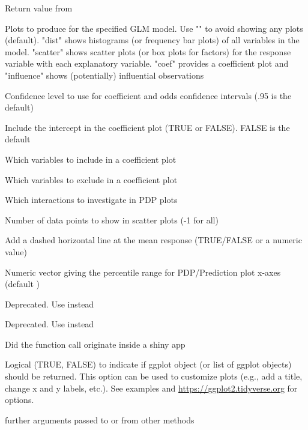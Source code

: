 \documentclass[a4paper]{book}
\begin{document}
\begin{Arguments}
\begin{ldescription}
\item[\code{x}] Return value from 

\item[\code{plots}] Plots to produce for the specified GLM model. Use "" to avoid showing any plots (default). "dist" shows histograms (or frequency bar plots) of all variables in the model. "scatter" shows scatter plots (or box plots for factors) for the response variable with each explanatory variable. "coef" provides a coefficient plot and "influence" shows (potentially) influential observations

\item[\code{conf\_lev}] Confidence level to use for coefficient and odds confidence intervals (.95 is the default)

\item[\code{intercept}] Include the intercept in the coefficient plot (TRUE or FALSE). FALSE is the default

\item[\code{incl}] Which variables to include in a coefficient plot

\item[\code{excl}] Which variables to exclude in a coefficient plot

\item[\code{incl\_int}] Which interactions to investigate in PDP plots

\item[\code{nrobs}] Number of data points to show in scatter plots (-1 for all)

\item[\code{hline}] Add a dashed horizontal line at the mean response (TRUE/FALSE or a numeric value)

\item[\code{pdp\_range}] Numeric vector  giving the percentile range for PDP/Prediction plot x-axes (default )

\item[\code{minq}] Deprecated. Use  instead

\item[\code{maxq}] Deprecated. Use  instead

\item[\code{shiny}] Did the function call originate inside a shiny app

\item[\code{custom}] Logical (TRUE, FALSE) to indicate if ggplot object (or list of ggplot objects) should be returned. This option can be used to customize plots (e.g., add a title, change x and y labels, etc.). See examples and \url{https://ggplot2.tidyverse.org} for options.

\item[\code{...}] further arguments passed to or from other methods
\end{ldescription}
\end{Arguments}
\end{document}
